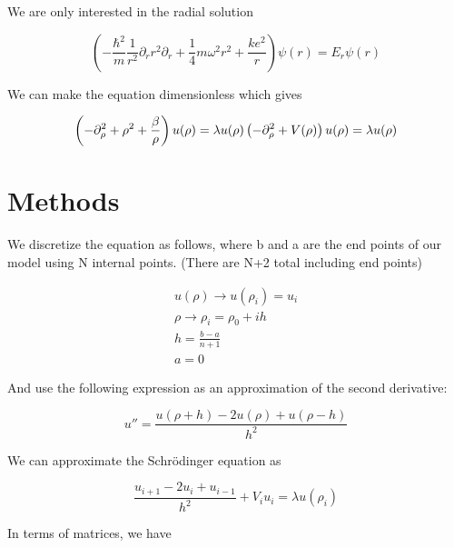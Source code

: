 \documentclass[twocolumn, groupedaddress]{revtex4-1}
\begin{document}
We are only interested in the radial solution

\begin{equation}
\left( - \frac{\hbar^2}{m} \frac{1}{r^2} \partial_r r^2 \partial_r + \frac{1}{4} m \omega^2 r^2 + \frac{k e^2}{r} \right) \psi (r)  = E_r \psi (r)
\end{equation}

We can make the equation dimensionless which gives

\begin{equation}
\left( - \partial_\rho^2 + \rho^2 + \frac{\beta}{\rho} \right) u ( \rho ) = \lambda u(\rho ) \\
\left( - \partial_\rho^2 + V (\rho ) \right) u ( \rho ) = \lambda u(\rho )
\end{equation}

\section{Methods}

We discretize the equation as follows, where b and a are the end points of our model using N internal points. (There are N+2 total including end points)

\begin{equation}
\begin{aligned}
u(\rho) \to u(\rho_i) = u_i \\
\rho \to \rho_i = \rho_0 + i h \\
h = \frac{b-a}{n+1} \\
a = 0
\end{aligned}
\end{equation}

And use the following expression as an approximation of the second derivative:

$$u''=\frac{u(\rho+h)-2u(\rho)+u(\rho-h)}{h^2}$$

We can approximate the Schr\"odinger equation as 

$$\frac{u_{i+1}-2u_i+u_{i-1}}{h^2}+V_iu_i=\lambda u(\rho_i)$$

In terms of matrices, we have
\end{document}
